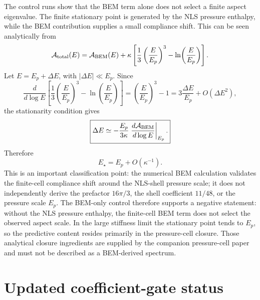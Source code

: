 \documentclass[11pt]{article}
\begin{document}
The control runs show that the BEM term alone does not select a finite aspect
eigenvalue.  The finite stationary point is generated by the NLS pressure
enthalpy, while the BEM contribution supplies a small compliance shift.  This
can be seen analytically from
\begin{equation}
  \mathcal A_{\rm total}(E)
  =
  \mathcal A_{\rm BEM}(E)
  +
  \kappa
  \left[
    \frac{1}{3}\left(\frac{E}{E_p}\right)^3
    -
    \ln\!\left(\frac{E}{E_p}\right)
  \right].
\end{equation}
Let \(E=E_p+\Delta E\), with \(|\Delta E|\ll E_p\).  Since
\begin{equation}
  \frac{d}{d\log E}
  \left[
    \frac{1}{3}\left(\frac{E}{E_p}\right)^3
    -
    \ln\!\left(\frac{E}{E_p}\right)
  \right]
  =
  \left(\frac{E}{E_p}\right)^3-1
  =
  3\frac{\Delta E}{E_p}
  +
  O(\Delta E^2),
\end{equation}
the stationarity condition gives
\begin{equation}
  \boxed{
  \Delta E
  \simeq
  -
  \frac{E_p}{3\kappa}
  \left.
  \frac{d\mathcal A_{\rm BEM}}{d\log E}
  \right|_{E_p}.
  }
  \label{eq:kappa-shift}
\end{equation}
Therefore
\begin{equation}
  E_\star=E_p+O(\kappa^{-1}).
\end{equation}
This is an important classification point: the numerical BEM calculation
validates the finite-cell compliance shift around the NLS-shell pressure scale;
it does not independently derive the prefactor \(16\pi/3\), the shell
coefficient \(11/48\), or the pressure scale \(E_p\).  The BEM-only control
therefore supports a negative statement: without the NLS pressure enthalpy, the
finite-cell BEM term does not select the observed aspect scale.  In the large
stiffness limit the stationary point tends to \(E_p\), so the predictive
content resides primarily in the pressure-cell closure.  Those analytical
closure ingredients are supplied by the companion pressure-cell paper and must
not be described as a BEM-derived spectrum.


\section{Updated coefficient-gate status}
\label{sec:updated-gate-status}
\end{document}
